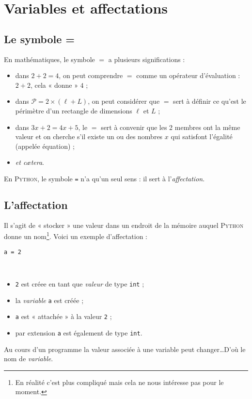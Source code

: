 \chapter{Variables et affectations}

\section{Le symbole =}

En mathématiques, le symbole $=$ a plusieurs significations :
\begin{itemize}
	\item dans $2+2=4$, on peut comprendre $=$ comme un opérateur d'évaluation : $2+2$, cela « donne » $4$ ;
	\item dans $\mathcal{P}=2\times(\ell+L)$, on peut considérer que $=$ sert à définir ce qu'est le périmètre d'un rectangle de dimensions $\ell$ et $L$ ;
	\item dans $3x + 2 = 4x +5$, le $=$ sert à convenir que les 2 membres ont la même valeur et on cherche s'il existe un ou des nombres $x$ qui satisfont l'égalité (appelée équation) ;
	\item \textit{et cætera}.
\end{itemize}

En \textsc{Python}, le symbole \texttt{=}  n'a qu'un seul sens : il sert à l'\textit{affectation}.

\section{L'affectation}
Il s'agit de « stocker » une valeur dans un endroit de la mémoire auquel \textsc{Python} donne un nom\footnote{En réalité c'est plus compliqué mais cela ne nous intéresse pas pour le moment.}. Voici un exemple d'affectation :
\begin{center}\Large
	\texttt{a = 2}
\end{center}\
\begin{itemize}
	\item   \texttt{2} est créee en tant que  \textit{valeur} de type \texttt{int} ;
	\item   la \textit{variable} \texttt{a} est créée ;\
	\item   \texttt{a} est « attachée » à la valeur \texttt{2} ;
	\item   par extension \texttt{a} est également de type \texttt{int}.
\end{itemize}
Au cours d'un programme la valeur associée à une variable peut changer\ldots D'où le nom de \textit{variable}.\\


